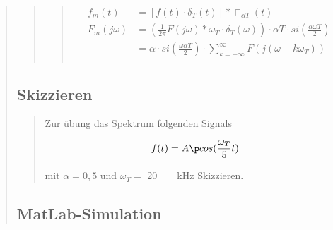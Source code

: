 \begin{quote}
\begin{quote}
\begin{quote}
            
            \begin{equation*}
                \begin{split}
                    f_m (t) &= [f (t) \cdot \delta_T (t)] \ast \sqcap_{\alpha T} (t)\\
                    F_m (j\omega) &= \left ( \frac{1}{2 \pi} F (j\omega) \ast \omega_T \cdot \delta_T (\omega) \right) \cdot
                    \alpha T \cdot si (\frac{\alpha \omega T}{2})\\
                    &= \alpha \cdot si \left( \frac{\omega \alpha T}{2} \right) \cdot \sum_{k=-\infty}^{\infty} F(j(\omega -
                    k\omega_T))\\
                \end{split}
            \end{equation*}
            
            
        \end{quote}
        
        
    \end{quote}
    
    
    \subsection{Skizzieren}
    \begin{quote}
        Zur übung das Spektrum folgenden Signals
        
        \begin{equation*}
        	\begin{split}
                f(t) = A \p cos(\frac{\omega_T}{5} t)
        	\end{split}
        \end{equation*}
        
        mit $\alpha = 0,5$ und $\omega_T =$ \SI{20}{\pi\ \kilo\hertz} Skizzieren.
        
    \end{quote}
    
    
    \subsection{MatLab-Simulation}
    \begin{quote}
        
    \end{quote}
    
    
    
    
    
    
\end{quote}

